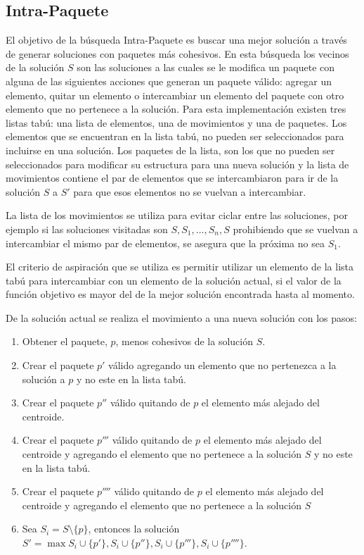 \subsection{Intra-Paquete}
El objetivo de la búsqueda Intra-Paquete es buscar una mejor solución a través de generar soluciones con paquetes más cohesivos. En esta búsqueda los vecinos de la solución $S$ son las soluciones a las cuales se le modifica un paquete con alguna de las siguientes acciones que generan un paquete válido: agregar un elemento, quitar un elemento o intercambiar un elemento del paquete con otro elemento que no pertenece a la solución. Para esta implementación existen tres listas tabú: una lista de elementos, una de movimientos y una de paquetes. Los elementos que se encuentran en la lista tabú, no pueden ser seleccionados para incluirse en una solución. Los paquetes de la lista, son los que no pueden ser seleccionados para modificar su estructura para una nueva solución y la lista de movimientos contiene el par de elementos que se intercambiaron para ir de la solución $S$ a $S'$ para que esos elementos no se vuelvan a intercambiar.

La lista de los movimientos se utiliza para evitar ciclar entre las soluciones, por ejemplo si las soluciones visitadas son $S, S_1, \ldots, S_n, S$ prohibiendo que se vuelvan a intercambiar el mismo par de elementos, se asegura que la próxima no sea $S_1$.

El criterio de aspiración que se utiliza es permitir utilizar un elemento de la lista tabú para intercambiar con un elemento de la solución actual, si el valor de la función objetivo es mayor del de la mejor solución encontrada hasta al momento.

De la solución actual se realiza el movimiento a una nueva solución con los pasos:
\begin{enumerate}
	\item Obtener el paquete, $p$, menos cohesivos de la solución $S$.
	\item Crear el paquete $p'$ válido agregando un elemento que no pertenezca a la solución a $p$ y no este en la lista tabú.
	\item Crear el paquete $p''$ válido quitando de $p$ el elemento más alejado del centroide.
	\item Crear el paquete $p'''$ válido quitando de $p$ el elemento más alejado del centroide y agregando el elemento que no pertenece a la solución $S$ y no este en la lista tabú.
	\item Crear el paquete $p''''$ válido quitando de $p$ el elemento más alejado del centroide y agregando el elemento que no pertenece a la solución $S$
	\item Sea $S_{i} = S\setminus \{p\}$, entonces la solución $S' = \max{S_{i}\cup\{p'\}, S_{i}\cup\{p''\}, S_{i}\cup\{p'''\}, S_{i}\cup\{p''''\}}$.
\end{enumerate}

